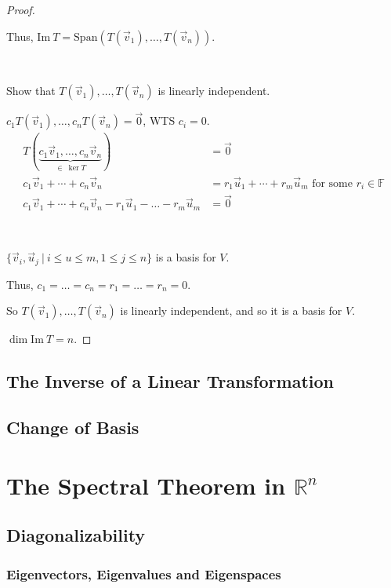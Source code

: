 \documentclass[11pt,fleqn]{book} %
\begin{document}
\begin{proof}
    {~~~}

    Thus, $\mathrm{Im}~T = \mathrm{Span}\left( T(\vec{v}_1), \dots, T(\vec{v}_n) \right)$. 

    {~~~}

    Show that $T(\vec{v}_1), \dots, T(\vec{v}_n)$ is linearly independent. 
    
    $c_1 T(\vec{v}_1), \dots, c_nT(\vec{v}_n) = \vec{0}$, WTS $c_i = 0$. 
    \begin{align*}
        T ( \underbrace{c_1\vec{v}_1, \dots, c_n\vec{v}_n}_{\in~\ker T} ) 
        &= \vec{0}
        \\
        c_1\vec{v}_1 + \cdots + c_n\vec{v}_n 
        &= r_1\vec{u}_1 + \cdots + r_m\vec{u}_m \text{ for some } r_i \in \mathbb{F}
        \\
        c_1\vec{v}_1 + \cdots + c_n\vec{v}_n - r_1\vec{u}_1 - \dots - r_m\vec{u}_m 
        &= \vec{0}
    \end{align*}
    
    {~~~}

    $\{\vec{v}_i, \vec{u}_j ~|~  i \le u \le m, 1 \le j \le n \}$ is a basis for $V$. 
    
    Thus, $c_1 = \dots = c_n = r_1 = \dots = r_n = 0$. 
    
    So $T(\vec{v}_1), \dots, T(\vec{v}_n)$ is linearly independent, and so it is a basis for $V$. 
    
    $\dim \mathrm{Im}~T = n$. 
\end{proof}

\section{The Inverse of a Linear Transformation}

\section{Change of Basis}

\chapter{The Spectral Theorem in $\mathbb{R}^n$}

\section{Diagonalizability}

\subsection{Eigenvectors, Eigenvalues and Eigenspaces}
\end{document}

